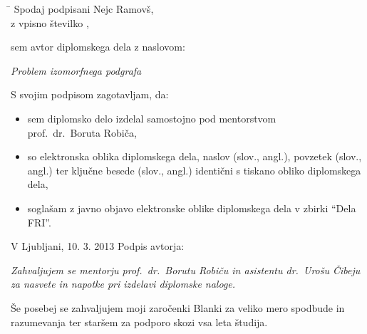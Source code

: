 \documentclass[a4paper, 12pt, ]{book}
\newcommand{\clearemptydoublepage}{\newpage{\pagestyle{empty}\cleardoublepage}}
\begin{document}
	\vspace{1cm}
	
	\begin{tabbing}
	\hspace*{4cm}\= \kill
	Spodaj podpisani \> Nejc Ramovš,  \\[0.3cm]
	z vpisno številko , \\
	\end{tabbing}
	
	\noindent sem avtor  diplomskega dela z naslovom:
	 
	
	\vspace{0.5cm}
	\emph{Problem izomorfnega podgrafa}
	
	\vspace{1.5cm}
	\noindent S svojim podpisom zagotavljam, da:
	\begin{itemize}
		\item sem diplomsko delo izdelal samostojno pod mentorstvom\\ prof.~dr.~Boruta Robiča,
	
		\item	so elektronska oblika diplomskega dela, naslov (slov., angl.), povzetek (slov., angl.) ter 
		ključne besede (slov., angl.) identični s tiskano obliko diplomskega dela,

		\item soglašam z javno objavo elektronske oblike diplomskega dela v zbirki ``Dela FRI''.
	\end{itemize}
	
	\vspace{1cm}
	\noindent V Ljubljani, 10. 3. 2013 \hspace{3cm} Podpis avtorja:
	
	\clearemptydoublepage
	
	
	
	
	\thispagestyle{empty}\mbox{}\vfill\null\it%
	Zahvaljujem se mentorju prof.~dr.~Borutu Robiču in asistentu dr.~Urošu Čibeju za nasvete in napotke pri izdelavi diplomske naloge.
	
	\vspace{1cm}
	
	Še posebej se zahvaljujem moji zaročenki Blanki za veliko mero spodbude in razumevanja ter staršem za podporo skozi vsa leta študija.
	\rm\normalfont
	
	\clearemptydoublepage
	
	
	\def\thepage{}%
	\tableofcontents{}
	
\end{document}
